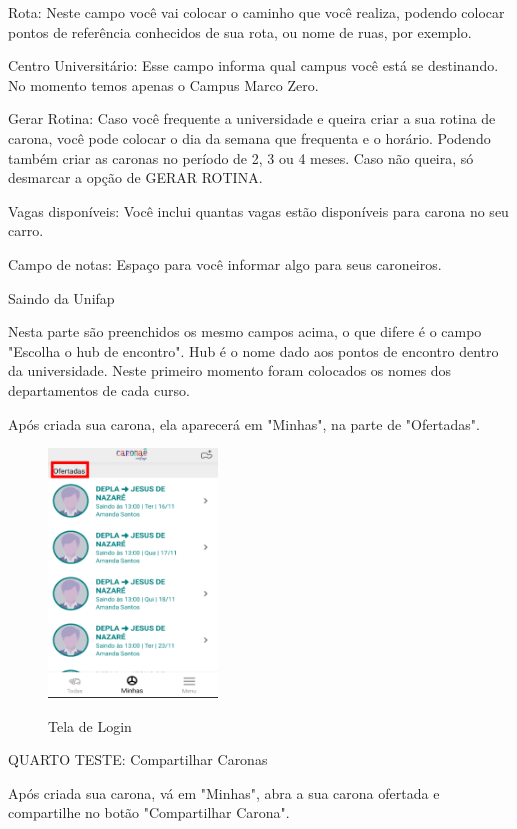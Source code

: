 Rota: Neste campo você vai colocar o caminho que você realiza, podendo colocar pontos
de referência conhecidos de sua rota, ou nome de ruas, por exemplo.

Centro Universitário: Esse campo informa qual campus você está se destinando. No
momento temos apenas o Campus Marco Zero.

Gerar Rotina: Caso você frequente a universidade e queira criar a sua rotina de carona,
você pode colocar o dia da semana que frequenta e o horário. Podendo também criar as
caronas no período de 2, 3 ou 4 meses. Caso não queira, só desmarcar a opção de GERAR
ROTINA.

Vagas disponíveis: Você inclui quantas vagas estão disponíveis para carona no seu
carro.

Campo de notas: Espaço para você informar algo para seus caroneiros.

Saindo da Unifap

Nesta parte são preenchidos os mesmo campos acima, o que difere é o campo "Escolha
o hub de encontro". Hub é o nome dado aos pontos de encontro dentro da
universidade. Neste primeiro momento foram colocados os nomes dos departamentos de
cada curso.

Após criada sua carona, ela aparecerá em "Minhas", na parte de "Ofertadas".

\begin{figure}[H]
	\centering
	\caption{Tela de Login}
	\includegraphics[width=0.4\textwidth]{./04-figuras/manual/criacao_de_carona_2.png}
	\label{fig:criacao_de_carona_2}
\end{figure}

QUARTO TESTE: Compartilhar Caronas

Após criada sua carona, vá em "Minhas", abra a sua carona ofertada e compartilhe no
botão "Compartilhar Carona".

